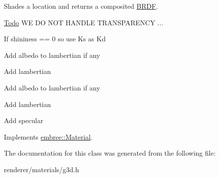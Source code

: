 Shades a location and returns a composited \hyperlink{classembree_1_1_b_r_d_f}{BRDF}. 



\begin{Desc}
\item[\hyperlink{todo__todo000002}{Todo}]WE DO NOT HANDLE TRANSPARENCY ... \end{Desc}


If shininess == 0 so use Ks as Kd

Add albedo to lambertian if any

Add lambertian

Add albedo to lambertian if any

Add lambertian

Add specular 



Implements \hyperlink{classembree_1_1_material_a371ca178d6cc226c3d6c758cb41f8cef}{embree::Material}.



The documentation for this class was generated from the following file:\begin{DoxyCompactItemize}
\item 
renderer/materials/g3d.h\end{DoxyCompactItemize}
